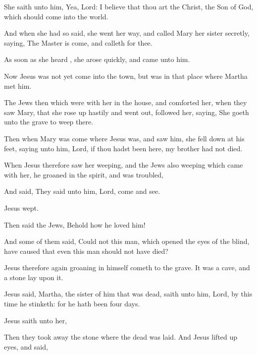 {

She
saith unto
him,
Yea,
Lord:
I
believe
that
thou
art the
Christ, the
Son of
God, which should
come
into the
world.

And when she
had
so
said, she went her
way,
and
called
Mary
her
sister
secretly,
saying, The
Master is
come,
and
calleth for
thee.

As soon
as
she
heard
{}, she
arose
quickly,
and
came
unto
him.

Now
Jesus
was not
yet
come
into the
town,
but
was
in that
place
where
Martha
met
him.

The
Jews
then which
were
with
her
in the
house,
and
comforted
her, when they
saw
Mary,
that she rose
up
hastily
and went
out,
followed
her,
saying, She
goeth
unto the
grave
to
weep
there.

Then
when
Mary was
come
where
Jesus
was, and
saw
him, she fell
down
at
his
feet,
saying unto
him,
Lord,
if thou hadst
been
here,
my
brother
had
not
died.

When
Jesus
therefore
saw
her
weeping,
and the
Jews
also
weeping which
came with
her,
he
groaned in the
spirit,
and was
troubled,

And
said,
{} They
said unto
him,
Lord,
come
and
see.

Jesus
wept.

Then
said the
Jews,
Behold
how he
loved
him!

And
some
of
them
said,
Could
not this
man, which
opened the
eyes of the
blind, have
caused
that
even this
man
should
not have
died?

Jesus
therefore
again
groaning
in
himself
cometh
to the
grave. It
was a
cave,
and a
stone
lay
upon
it.

Jesus
said,
{}
Martha, the
sister of him that was
dead,
saith unto
him,
Lord, by this
time he
stinketh:
for he hath
been
{} four
days.

Jesus
saith unto
her,
{}

Then they took
away the
stone
{}
where the
dead
was
laid.
And
Jesus
lifted
up
{}
eyes,
and
said,
{}


}
